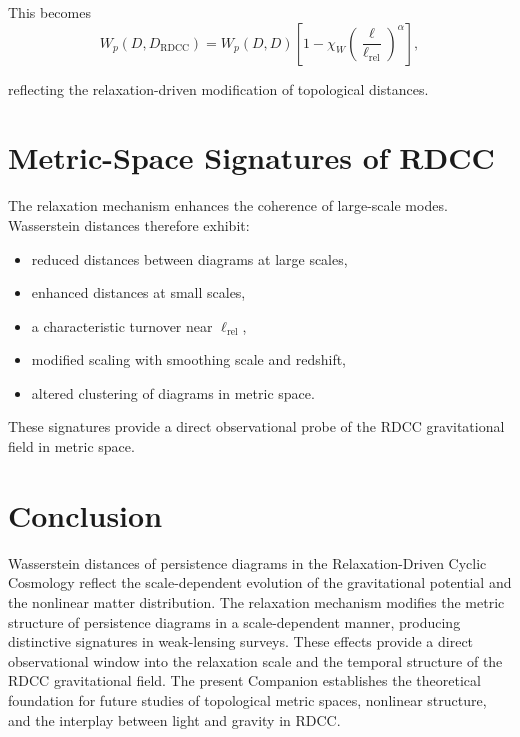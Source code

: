 \documentclass[11pt,a4paper]{article}
\begin{document}
This becomes
\begin{equation}
    W_{p}(D, D_{\mathrm{RDCC}})
    = W_{p}(D,D)
      \left[
        1 - \chi_{W}
        \left(\frac{\ell}{\ell_{\mathrm{rel}}}\right)^{\alpha}
      \right],
\end{equation}

reflecting the relaxation-driven modification of topological distances.
\section{Metric-Space Signatures of RDCC}

The relaxation mechanism enhances the coherence of large-scale modes. Wasserstein 
distances therefore exhibit:

\begin{itemize}
    \item reduced distances between diagrams at large scales,
    \item enhanced distances at small scales,
    \item a characteristic turnover near $\ell_{\mathrm{rel}}$,
    \item modified scaling with smoothing scale and redshift,
    \item altered clustering of diagrams in metric space.
\end{itemize}

These signatures provide a direct observational probe of the RDCC gravitational 
field in metric space.
\section{Conclusion}

Wasserstein distances of persistence diagrams in the Relaxation-Driven Cyclic 
Cosmology reflect the scale-dependent evolution of the gravitational potential and 
the nonlinear matter distribution. The relaxation mechanism modifies the metric 
structure of persistence diagrams in a scale-dependent manner, producing 
distinctive signatures in weak-lensing surveys. These effects provide a direct 
observational window into the relaxation scale and the temporal structure of the 
RDCC gravitational field. The present Companion establishes the theoretical 
foundation for future studies of topological metric spaces, nonlinear structure, 
and the interplay between light and gravity in RDCC.


\nocite{*}

\end{document}
